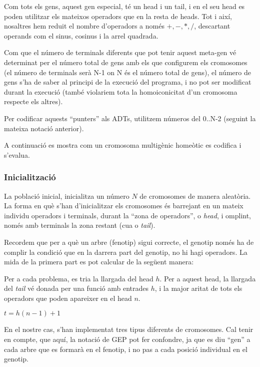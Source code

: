 \documentclass[titlepage,a4paper,12pt]{book}
\begin{document}
Com tots els gens, aquest gen especial, té un head i un tail, i en el seu head
es poden utilitzar els mateixos operadors que en la resta de heads.  Tot i així,
nosaltres hem reduit el nombre d'operadors a només $+,-,*,/$, descartant
operands com el sinus, cosinus i la arrel quadrada.

Com que el número de terminals diferents que pot tenir aquest meta-gen vé
determinat per el número total de gens amb els que configurem els cromosomes (el
número de terminals serà N-1 on N és el número total de gens), el número de gens
s'ha de saber al principi de la execució del programa, i no pot ser modificat
durant la execució (també violariem tota la homoiconicitat  d'un cromosoma respecte
els altres).

Per codificar aquests ``punters'' als ADTs, utilitzem números del 0..N-2
(seguint la mateixa notació anterior).

A continuació es mostra com un cromosoma multigènic homeòtic es codifica i
s'evalua.


\subsubsection{Inicialització} %
\label{ssub:Inicialitzacio}
La població inicial, inicialitza un número $N$ de cromosomes de manera
aleatòria.  La forma en què s'han d'inicialitzar els cromosomes és barrejant en
un mateix individu operadors i terminals, durant la ``zona de operadors'', o
\emph{head}, i omplint, només amb terminals la zona restant (cua o \emph{tail}).

Recordem que per a què un arbre (fenotip) sigui correcte, el genotip només ha de
complir la condició que en la darrera part del genotip, no hi hagi operadors.
La mida de la primera part es pot calcular de la següent manera:

Per a cada problema, es tria la llargada del head $h$.  Per a aquest head, la
llargada del \emph{tail} vé donada per una funció amb entrades $h$, i la major
aritat de tots els operadors que poden apareixer en el head $n$.

\begin{math}
t =  h (n-1) + 1
\end{math}

En el nostre cas, s'han implementat tres tipus diferents de cromosomes. Cal
tenir en compte, que aquí, la notació de GEP pot fer confondre, ja que es diu
``gen'' a cada arbre que es formarà en el fenotip, i no pas a cada posició
individual en el genotip.
\end{document}
